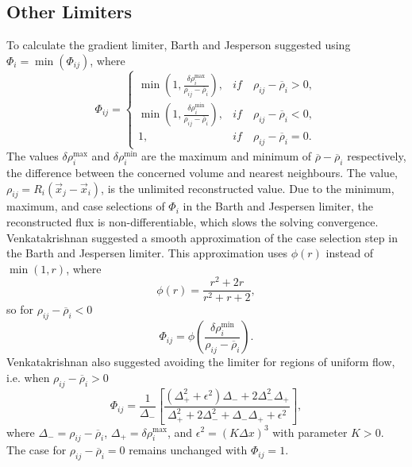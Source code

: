 	\subsection*{Other Limiters}

	To calculate the gradient limiter, Barth and Jesperson \cite{Barth89} suggested using $\Phi_i=\min\left(\Phi_{ij}\right)$, where
	\begin{equation}
		\Phi_{ij}=
		\begin{cases}
			\min\left(1,\frac{\delta \rho_i^{\max}}{\rho_{ij}-\overline{\rho}_i}\right), & if \quad \rho_{ij}-\overline{\rho}_i>0, \\
			\min\left(1,\frac{\delta \rho_i^{\min}}{\rho_{ij}-\overline{\rho}_i}\right), & if \quad \rho_{ij}-\overline{\rho}_i<0,\\
			1, & if \quad \rho_{ij}-\overline{\rho}_i=0.
		\end{cases}
		\nonumber
	\end{equation}
	The values $\delta \rho_i^{\max}$ and $\delta \rho_i^{\min}$ are the maximum and minimum of $\overline{\rho}-\overline{\rho}_i$ respectively, the difference between the concerned volume and nearest neighbours. The value, $\rho_{ij}=R_i\left(\vec{x}_j-\vec{x}_i\right)$, is the unlimited reconstructed value. Due to the minimum, maximum, and case selections of $\Phi_i$ in the Barth and Jespersen limiter, the reconstructed flux is non-differentiable, which slows the solving convergence. Venkatakrishnan \cite{Venkatakrishnan93} suggested a smooth approximation of the case selection step in the Barth and Jespersen limiter. This approximation uses $\phi(r)$ instead of $\min(1,r)$, where 
	\begin{equation}
		\phi(r)=\frac{r^2+2r}{r^2+r+2}, \label{eq:ven_approx}
	\end{equation}
	so for $\rho_{ij}-\overline{\rho}_i<0$
	\begin{equation}
		\Phi_{ij}=\phi\left(\frac{\delta \rho_i^{\min}}{\rho_{ij}-\overline{\rho}_i}\right). \nonumber
	\end{equation}
	Venkatakrishnan also suggested avoiding the limiter for regions of uniform flow, i.e. when $\rho_{ij}-\overline{\rho}_i>0$
	\begin{equation}
		\Phi_{ij}=\frac{1}{\Delta_-}\left[\frac{\left(\Delta_+^2+\epsilon^2\right)\Delta_-+2\Delta_-^2\Delta_+}{\Delta_+^2+2\Delta_-^2+\Delta_-\Delta_++\epsilon^2}\right], \nonumber
	\end{equation}
	where $\Delta_-=\rho_{ij}-\overline{\rho}_i$, $\Delta_+=\delta \rho_i^{\max}$, and $\epsilon^2=\left(K\Delta x\right)^3$ with parameter $K>0$. The case for $\rho_{ij}-\overline{\rho}_i=0$ remains unchanged with $\Phi_{ij}=1$.
	
